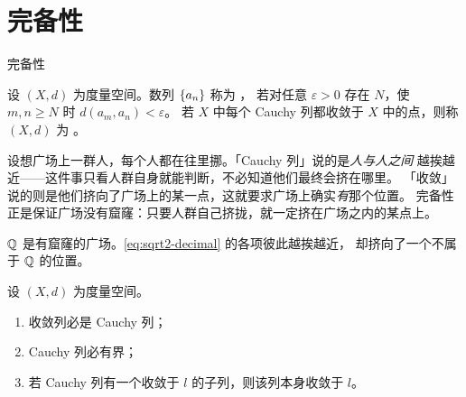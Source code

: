 \section{完备性}
\label{sec:completeness}

\begin{concept}{完备性}
\end{concept}

\begin{definition}
  \label{def:complete}
  设 \((X,d)\) 为度量空间。数列 \(\{a_{n}\}\) 称为 ，
  若对任意 \(\varepsilon>0\) 存在 \(N\)，使 \(m,n \ge N\) 时 \(d(a_{m},a_{n})<\varepsilon\)。
  若 \(X\) 中每个 Cauchy 列都收敛于 \(X\) 中的点，则称 \((X,d)\) 为%
  。
\end{definition}

\begin{intuition}
  设想广场上一群人，每个人都在往里挪。「Cauchy 列」说的是\emph{人与人之间}
  越挨越近——这件事只看人群自身就能判断，不必知道他们最终会挤在哪里。
  「收敛」说的则是他们挤向了广场上的某一点，这就要求广场上确实\emph{有}那个位置。
  完备性正是保证广场没有窟窿：只要人群自己挤拢，就一定挤在广场之内的某点上。

  \(\mathbb{Q}\) 是有窟窿的广场。\cref{eq:sqrt2-decimal} 的各项彼此越挨越近，
  却挤向了一个不属于 \(\mathbb{Q}\) 的位置。
\end{intuition}

\begin{proposition}
  \label{prop:cauchy-basics}
  设 \((X,d)\) 为度量空间。
  \begin{enumerate}[label=(\roman*)]
    \item 收敛列必是 Cauchy 列；
    \item Cauchy 列必有界；
    \item 若 Cauchy 列有一个收敛于 \(l\) 的子列，则该列本身收敛于 \(l\)。
  \end{enumerate}
\end{proposition}

